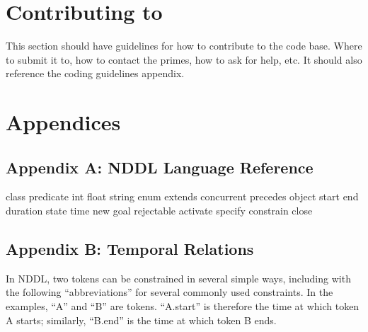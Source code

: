 \documentclass[10pt, letterpaper, twoside]{article}
\begin{document}
\section{Contributing to \ET}

This section should have guidelines for how to contribute to the code
base.  Where to submit it to, how to contact the primes, how to ask for
help, etc.  It should also reference the coding guidelines appendix.




\section{Appendices}
\subsection{Appendix A: NDDL Language Reference}
\label{nddl}

class
predicate
int
float
string
enum
extends
concurrent
precedes
object
start
end
duration
state
time
new
goal
rejectable
activate
specify
constrain
close

\subsection{Appendix B: Temporal Relations}
\label{allen}

In NDDL, two tokens can be constrained in several simple ways,
including with the following ``abbreviations'' for several commonly
used constraints.  In the examples, ``A'' and ``B'' are tokens.
``A.start'' is therefore the time at which token A starts; similarly,
``B.end'' is the time at which token B ends.
\end{document}
